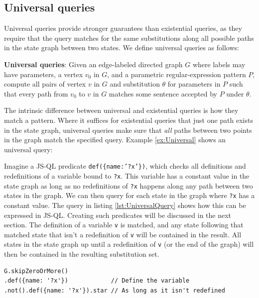 \subsection{Universal queries}

Universal queries provide stronger guarantees than existential queries, as they require that the query matches for the same substitutions along all possible paths in the state graph between two states. We define universal queries as follows:

\begin{definition}
\textbf{Universal queries}: Given an edge-labeled directed graph $G$ where labels may have parameters, a vertex $v_0$ in $G$, and a parametric regular-expression pattern $P$, compute all pairs of vertex $v$ in $G$ and substitution $\theta$ for parameters in $P$ such that every path from $v_0$ to $v$ in $G$ matches some sentence accepted by $P$ under $\theta$.
\end{definition}

The intrinsic difference between universal and existential queries is how they match a pattern. Where it suffices for existential queries that just one path exists in the state graph, universal queries make sure that \textit{all} paths between two points in the graph match the specified query. Example \ref{ex:Universal} shows an universal query:

\begin{exmp}
\label{ex:Universal}
Imagine a JS-QL predicate \texttt{def(\{name:'?x'\})}, which checks all definitions and redefinitions of a variable bound to \texttt{?x}. This variable has a constant value in the state graph as long as no redefinitions of \texttt{?x} happens along any path between two states in the graph. We can then query for each state in the graph where \texttt{?x} has a constant value. The query in listing \ref{lst:UniversalQuery} shows how this can be expressed in JS-QL. Creating such predicates will be discussed in the next section. The definition of a variable \texttt{v} is matched, and any state following that matched state that isn't a redefinition of \texttt{v} will be contained in the result. All states in the state graph up until a redefinition of \texttt{v} (or the end of the graph) will then be contained in the resulting substitution set.

\begin{lstlisting}[label={lst:UniversalQuery},language=JSQL, caption=Checking for constant folding using a universal query,mathescape=true]
G.skipZeroOrMore()
.def({name: '?x'})            // Define the variable
.not().def({name: '?x'}).star // As long as it isn't redefined
\end{lstlisting}

\end{exmp}

